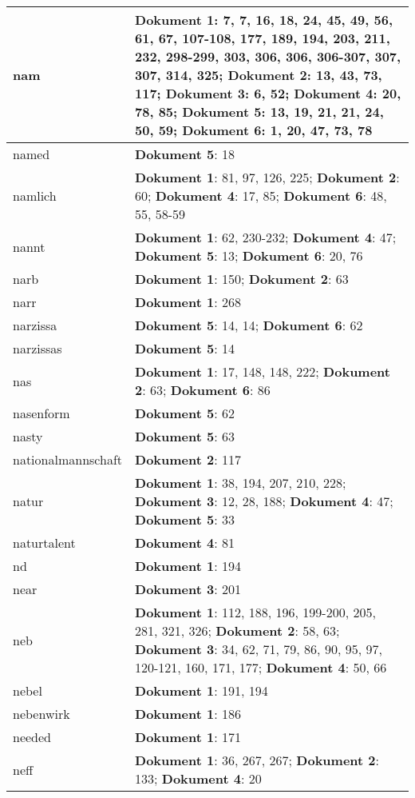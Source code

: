 \documentclass[a5paper]{article}
\begin{document}
\begin{longtable}[l]{|l|p{3in}|}
\hline
nam & \textbf{Dokument 1}: 7, 7, 16, 18, 24, 45, 49, 56, 61, 67, 107-108, 177, 189, 194, 203, 211, 232, 298-299, 303, 306, 306, 306-307, 307, 307, 314, 325; \textbf{Dokument 2}: 13, 43, 73, 117; \textbf{Dokument 3}: 6, 52; \textbf{Dokument 4}: 20, 78, 85; \textbf{Dokument 5}: 13, 19, 21, 21, 24, 50, 59; \textbf{Dokument 6}: 1, 20, 47, 73, 78 \\
\hline
named & \textbf{Dokument 5}: 18 \\
\hline
namlich & \textbf{Dokument 1}: 81, 97, 126, 225; \textbf{Dokument 2}: 60; \textbf{Dokument 4}: 17, 85; \textbf{Dokument 6}: 48, 55, 58-59 \\
\hline
nannt & \textbf{Dokument 1}: 62, 230-232; \textbf{Dokument 4}: 47; \textbf{Dokument 5}: 13; \textbf{Dokument 6}: 20, 76 \\
\hline
narb & \textbf{Dokument 1}: 150; \textbf{Dokument 2}: 63 \\
\hline
narr & \textbf{Dokument 1}: 268 \\
\hline
narzissa & \textbf{Dokument 5}: 14, 14; \textbf{Dokument 6}: 62 \\
\hline
narzissas & \textbf{Dokument 5}: 14 \\
\hline
nas & \textbf{Dokument 1}: 17, 148, 148, 222; \textbf{Dokument 2}: 63; \textbf{Dokument 6}: 86 \\
\hline
nasenform & \textbf{Dokument 5}: 62 \\
\hline
nasty & \textbf{Dokument 5}: 63 \\
\hline
nationalmannschaft & \textbf{Dokument 2}: 117 \\
\hline
natur & \textbf{Dokument 1}: 38, 194, 207, 210, 228; \textbf{Dokument 3}: 12, 28, 188; \textbf{Dokument 4}: 47; \textbf{Dokument 5}: 33 \\
\hline
naturtalent & \textbf{Dokument 4}: 81 \\
\hline
nd & \textbf{Dokument 1}: 194 \\
\hline
near & \textbf{Dokument 3}: 201 \\
\hline
neb & \textbf{Dokument 1}: 112, 188, 196, 199-200, 205, 281, 321, 326; \textbf{Dokument 2}: 58, 63; \textbf{Dokument 3}: 34, 62, 71, 79, 86, 90, 95, 97, 120-121, 160, 171, 177; \textbf{Dokument 4}: 50, 66 \\
\hline
nebel & \textbf{Dokument 1}: 191, 194 \\
\hline
nebenwirk & \textbf{Dokument 1}: 186 \\
\hline
needed & \textbf{Dokument 1}: 171 \\
\hline
neff & \textbf{Dokument 1}: 36, 267, 267; \textbf{Dokument 2}: 133; \textbf{Dokument 4}: 20 \\

\end{longtable}
\end{document}

